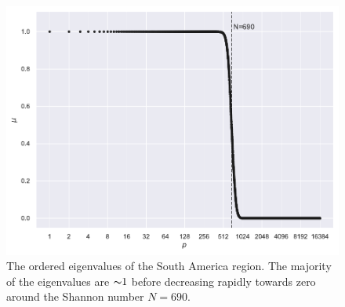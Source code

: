 \begin{figure}[htpb]
	\centering\capstart{}
	\includegraphics[width=\textwidth]{south_america_eigenvalues_L128.pdf}
	\caption[
		The Slepian eigenvalues of the South America region
	]{
		The ordered eigenvalues of the South America region.
		The majority of the eigenvalues are \({\thicksim}\num{1}\) before decreasing rapidly towards zero around the Shannon number \(N=690\).
	}\label{fig:chapter4_eigenvalues}
\end{figure}
